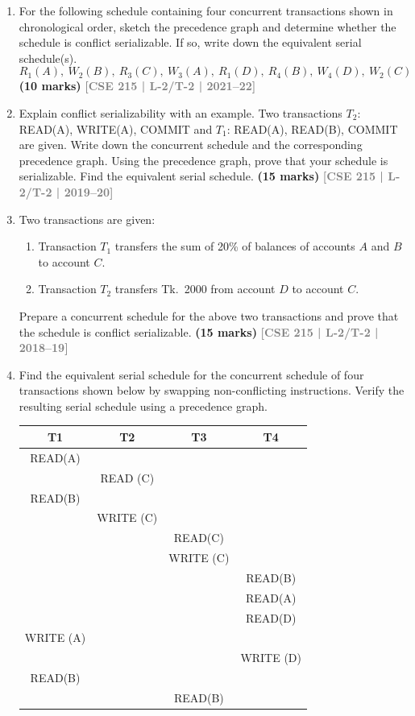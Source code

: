 \documentclass[12pt]{article}
\newcommand{\yr}[1]{\hfill\textcolor{gray}{\small\textbf{[#1]}}}
\newcommand{\mk}[1]{\textcolor{orange!70!black}{\small\textbf{(#1 marks)}}}
\begin{document}
\begin{enumerate}
\item For the following schedule containing four concurrent transactions shown in chronological order, sketch the precedence graph and determine whether the schedule is conflict serializable. If so, write down the equivalent serial schedule(s).
\[R_1(A),\ W_2(B),\ R_3(C),\ W_3(A),\ R_1(D),\ R_4(B),\ W_4(D),\ W_2(C)\]
\mk{10} \yr{CSE 215 | L-2/T-2 | 2021--22}


\item Explain conflict serializability with an example. Two transactions $T_2$: READ(A), WRITE(A), COMMIT and $T_1$: READ(A), READ(B), COMMIT are given. Write down the concurrent schedule and the corresponding precedence graph. Using the precedence graph, prove that your schedule is serializable. Find the equivalent serial schedule.
\mk{15} \yr{CSE 215 | L-2/T-2 | 2019--20}


\item Two transactions are given:
\begin{enumerate}
  \item Transaction $T_1$ transfers the sum of 20\% of balances of accounts $A$ and $B$ to account $C$.
  \item Transaction $T_2$ transfers Tk.\ 2000 from account $D$ to account $C$.
\end{enumerate}
Prepare a concurrent schedule for the above two transactions and prove that the schedule is conflict serializable.
\mk{15} \yr{CSE 215 | L-2/T-2 | 2018--19}


\item Find the equivalent serial schedule for the concurrent schedule of four transactions shown below by swapping non-conflicting instructions. Verify the resulting serial schedule using a precedence graph.

\medskip
\begin{center}
\renewcommand{\arraystretch}{1.3} %
    \begin{tabular}{|c|c|c|c|}
        \hline
        \textbf{T1} & \textbf{T2} & \textbf{T3} & \textbf{T4} \\
        \hline
        READ(A) & & & \\
        \hline
        & READ (C) & & \\
        \hline
        READ(B) & & & \\
        \hline
        & WRITE (C) & & \\
        \hline
        & & READ(C) & \\
        \hline
        & & WRITE (C) & \\
        \hline
        & & & READ(B) \\
        \hline
        & & & READ(A) \\
        \hline
        & & & READ(D) \\
        \hline
        WRITE (A) & & & \\
        \hline
        & & & WRITE (D) \\
        \hline
        READ(B) & & & \\
        \hline
        & & READ(B) & \\
        \hline
    \end{tabular}
    

\end{center}
\end{enumerate}
\end{document}
